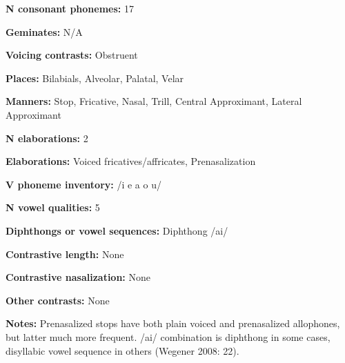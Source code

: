 \begin{styleBody}
\textbf{N consonant phonemes:} 17
\end{styleBody}

\begin{styleBody}
\textbf{Geminates:} N/A
\end{styleBody}

\begin{styleBody}
\textbf{Voicing contrasts:} Obstruent
\end{styleBody}

\begin{styleBody}
\textbf{Places:} Bilabials, Alveolar, Palatal, Velar
\end{styleBody}

\begin{styleBody}
\textbf{Manners:} Stop, Fricative, Nasal, Trill, Central Approximant, Lateral Approximant
\end{styleBody}

\begin{styleBody}
\textbf{N elaborations:} 2
\end{styleBody}

\begin{styleBody}
\textbf{Elaborations:} Voiced fricatives/affricates, Prenasalization
\end{styleBody}

\begin{styleBody}
\textbf{V phoneme inventory:} /i e a o u/
\end{styleBody}

\begin{styleBody}
\textbf{N vowel qualities:} 5
\end{styleBody}

\begin{styleBody}
\textbf{Diphthongs or vowel sequences:} Diphthong /ai/
\end{styleBody}

\begin{styleBody}
\textbf{Contrastive length:} None
\end{styleBody}

\begin{styleBody}
\textbf{Contrastive nasalization:} None
\end{styleBody}

\begin{styleBody}
\textbf{Other contrasts:} None
\end{styleBody}

\begin{styleBody}
\textbf{Notes:} Prenasalized stops have both plain voiced and prenasalized allophones, but latter much more frequent. /ai/ combination is diphthong in some cases, disyllabic vowel sequence in others (Wegener 2008: 22).
\end{styleBody}

